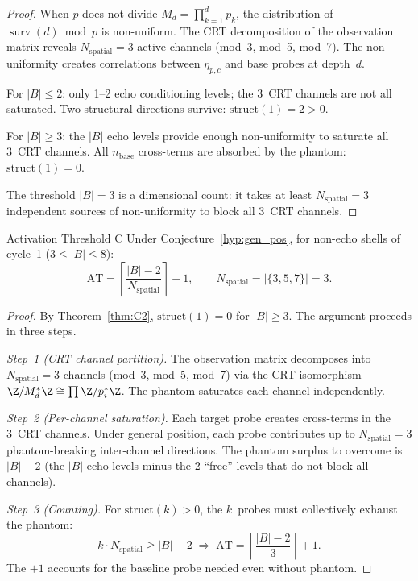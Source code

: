 \documentclass[12pt,a4paper]{article}
\begin{document}
\begin{proof}
When $p$ does not divide $M_d = \prod_{k=1}^{d} p_k$, the distribution of
$\operatorname{surv}(d) \bmod p$ is non-uniform.  The CRT decomposition of the
observation matrix reveals $N_{\mathrm{spatial}} = 3$ active channels
(mod~3, mod~5, mod~7).  The non-uniformity creates correlations between
$\eta_{p,c}$ and base probes at depth~$d$.

For $|B| \le 2$: only 1--2 echo conditioning levels; the 3~CRT channels are
not all saturated.  Two structural directions survive:
$\mathrm{struct}(1) = 2 > 0$.

For $|B| \ge 3$: the $|B|$ echo levels provide enough non-uniformity to
saturate all 3~CRT channels.  All $n_{\mathrm{base}}$ cross-terms are absorbed
by the phantom: $\mathrm{struct}(1) = 0$.

The threshold $|B| = 3$ is a dimensional count: it takes at least
$N_{\mathrm{spatial}} = 3$ independent sources of non-uniformity to block all
3~CRT channels.
\end{proof}

\begin{thmbox}{Activation Threshold C}
\label{thm:AT_C}
Under Conjecture~\ref{hyp:gen_pos}, for non-echo shells of cycle~1
($3 \le |B| \le 8$):
\[
  \mathrm{AT} = \left\lceil \frac{|B| - 2}{N_{\mathrm{spatial}}} \right\rceil + 1,
  \qquad N_{\mathrm{spatial}} = |\{3, 5, 7\}| = 3.
\]
\end{thmbox}

\begin{proof}
By Theorem~\ref{thm:C2}, $\mathrm{struct}(1) = 0$ for $|B| \ge 3$.  The
argument proceeds in three steps.

\emph{Step~1 (CRT channel partition).}  The observation matrix decomposes into
$N_{\mathrm{spatial}} = 3$ channels (mod~3, mod~5, mod~7) via the CRT
isomorphism $\Z/M_d^*\Z \cong \prod \Z/p_i^*\Z$.  The phantom saturates each
channel independently.

\emph{Step~2 (Per-channel saturation).}  Each target probe creates cross-terms
in the 3~CRT channels.  Under general position, each probe contributes up to
$N_{\mathrm{spatial}} = 3$ phantom-breaking inter-channel directions.  The
phantom surplus to overcome is $|B| - 2$ (the $|B|$ echo levels minus the 2
``free'' levels that do not block all channels).

\emph{Step~3 (Counting).}  For $\mathrm{struct}(k) > 0$, the $k$~probes must
collectively exhaust the phantom:
\[
  k \cdot N_{\mathrm{spatial}} \ge |B| - 2
  \;\Longrightarrow\;
  \mathrm{AT} = \left\lceil\frac{|B|-2}{3}\right\rceil + 1.
\]
The $+1$ accounts for the baseline probe needed even without phantom.
\end{proof}
\end{document}
